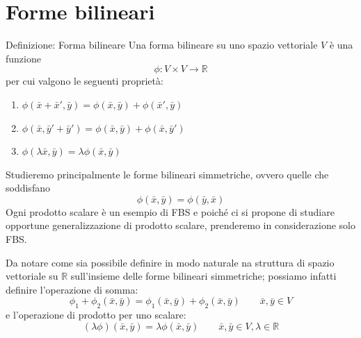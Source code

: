 \documentclass[x11names]{article}
\begin{document}
\newpage
\section{Forme bilineari}
	\begin{center}
	\colorbox{myblue}{\begin{minipage}{5.75in}
			\begin{blues}{Definizione: Forma bilineare}
			Una forma bilineare su uno spazio vettoriale $V$ è una funzione
			\[
			\phi: V\times V \to \mathbb{R}
			\]
			per cui valgono le seguenti proprietà:
			\begin{enumerate}
				\item $\phi (\bar{x} + \bar{x}',\bar{y}) = \phi (\bar{x},\bar{y}) + \phi (\bar{x}',\bar{y})$
				\item $\phi (\bar{x}, \bar{y}' + \bar{y}') = \phi (\bar{x},\bar{y}) + \phi (\bar{x},\bar{y}')$
				\item  $\phi(\lambda\bar{x},\bar{y}) = \lambda \phi(\bar{x},\bar{y})$
			\end{enumerate}
			\end{blues}
	\end{minipage}}       
\end{center}

\noindent
Studieremo principalmente le forme bilineari simmetriche, ovvero quelle che soddisfano
\[
\phi(\bar{x},\bar{y}) = \phi (\bar{y},\bar{x})
\]
Ogni prodotto scalare è un esempio di FBS e poiché ci si propone di studiare opportune generalizzazione di prodotto scalare, prenderemo in considerazione solo FBS.

Da notare come sia possibile definire in modo naturale na struttura di spazio vettoriale su $\mathbb{R}$ sull'insieme delle forme bilineari simmetriche; possiamo infatti definire l'operazione di somma:
\[
\phi _{1} + \phi_2(\bar{x},\bar{y}) = \phi_{1}(\bar{x},\bar{y}) + \phi_{2}(\bar{x},\bar{y}) \qquad \bar{x},\bar{y} \in V
\]
e l'operazione di prodotto per uno scalare:
\[
(\lambda\phi)(\bar{x},\bar{y}) = \lambda\phi(\bar{x},\bar{y})\qquad \bar{x},\bar{y} \in V, \lambda \in \mathbb{R}
\]
\end{document}
